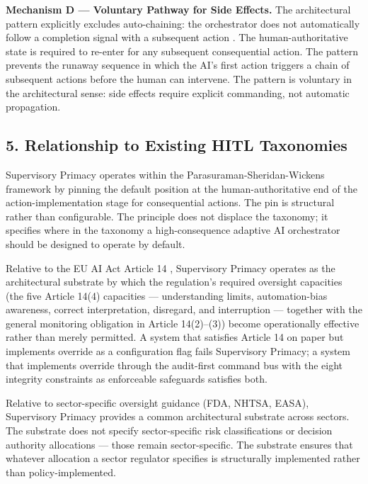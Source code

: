 \textbf{Mechanism D --- Voluntary Pathway for Side Effects.} The
architectural pattern explicitly excludes auto-chaining: the
orchestrator does not automatically follow a completion signal with a
subsequent action \cite{ref3}. The human-authoritative state is required to
re-enter for any subsequent consequential action. The pattern prevents
the runaway sequence in which the AI's first action triggers a chain of
subsequent actions before the human can intervene. The pattern is
voluntary in the architectural sense: side effects require explicit
commanding, not automatic propagation.

\subsection{5. Relationship to Existing HITL
Taxonomies}\label{relationship-to-existing-hitl-taxonomies}

Supervisory Primacy operates within the Parasuraman-Sheridan-Wickens
framework \cite{ref2} by pinning the default position at the
human-authoritative end of the action-implementation stage for
consequential actions. The pin is structural rather than configurable.
The principle does not displace the taxonomy; it specifies where in the
taxonomy a high-consequence adaptive AI orchestrator should be designed
to operate by default.

Relative to the EU AI Act Article 14 \cite{ref1}, Supervisory Primacy
operates as the architectural substrate by which the regulation's
required oversight capacities (the five Article 14(4) capacities ---
understanding limits, automation-bias awareness, correct interpretation,
disregard, and interruption --- together with the general monitoring
obligation in Article 14(2)--(3)) become operationally effective rather
than merely permitted. A system that satisfies Article 14 on paper but
implements override as a configuration flag fails Supervisory Primacy; a
system that implements override through the audit-first command bus with
the eight integrity constraints as enforceable safeguards satisfies
both.

Relative to sector-specific oversight guidance (FDA, NHTSA, EASA),
Supervisory Primacy provides a common architectural substrate across
sectors. The substrate does not specify sector-specific risk
classifications or decision authority allocations --- those remain
sector-specific. The substrate ensures that whatever allocation a sector
regulator specifies is structurally implemented rather than
policy-implemented.

